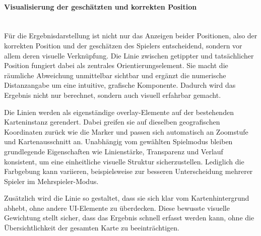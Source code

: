\paragraph{Visualisierung der geschätzten und korrekten Position}
\mbox{}\\
Für die Ergebnisdarstellung ist nicht nur das Anzeigen beider Positionen, also der korrekten Position und der geschätzen des Spielers entscheidend, sondern vor allem deren visuelle Verknüpfung. Die Linie zwischen getippter und tatsächlicher Position fungiert dabei als zentrales Orientierungselement. Sie macht die räumliche Abweichung unmittelbar sichtbar und ergänzt die numerische Distanzangabe um eine intuitive, grafische Komponente. Dadurch wird das Ergebnis nicht nur berechnet, sondern auch visuell erfahrbar gemacht.

Die Linien werden als eigenständige \gls{overlay}-Elemente auf der bestehenden Karteninstanz gerendert. Dabei greifen sie auf dieselben geografischen Koordinaten zurück wie die Marker und passen sich automatisch an Zoomstufe und Kartenausschnitt an. Unabhängig vom gewählten Spielmodus bleiben grundlegende Eigenschaften wie Linienstärke, Transparenz und Verlauf konsistent, um eine einheitliche visuelle Struktur sicherzustellen. Lediglich die Farbgebung kann variieren, beispielsweise zur besseren Unterscheidung mehrerer Spieler im Mehrspieler-Modus.

Zusätzlich wird die Linie so gestaltet, dass sie sich klar vom Kartenhintergrund abhebt, ohne andere UI-Elemente zu überdecken. Diese bewusste visuelle Gewichtung stellt sicher, dass das Ergebnis schnell erfasst werden kann, ohne die Übersichtlichkeit der gesamten Karte zu beeinträchtigen.


